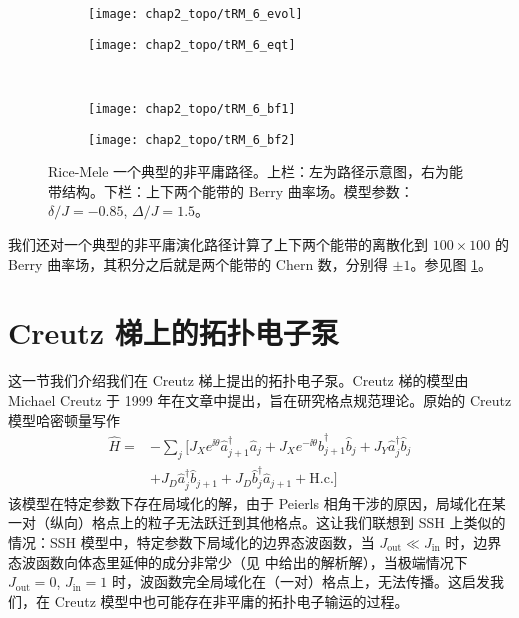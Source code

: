 \begin{figure}[!htb]
\centering
\begin{subfigure}{.45\textwidth}
\texttt{[image: chap2\_topo/tRM\_6\_evol]}
\end{subfigure}
\begin{subfigure}{.45\textwidth}
\texttt{[image: chap2\_topo/tRM\_6\_eqt]}
\end{subfigure}\\
\begin{subfigure}{.45\textwidth}
\texttt{[image: chap2\_topo/tRM\_6\_bf1]}
\end{subfigure}
\begin{subfigure}{.45\textwidth}
\texttt{[image: chap2\_topo/tRM\_6\_bf2]}
\end{subfigure}
\caption{Rice-Mele 一个典型的非平庸路径。上栏：左为路径示意图，右为能带结构。下栏：上下两个能带的 Berry 曲率场。模型参数：$\delta/J=-0.85$, $\Delta/J=1.5$。}
\label{fig:rmtberry}
\end{figure}

我们还对一个典型的非平庸演化路径计算了上下两个能带的离散化到 $100\times100$ 的 Berry 曲率场，其积分之后就是两个能带的 Chern 数，分别得 $\pm1$。参见图 \ref{fig:rmtberry}。



\section{ Creutz 梯上的拓扑电子泵}\label{sec:creutz}
这一节我们介绍我们在 Creutz 梯上提出的拓扑电子泵。Creutz 梯的模型由 Michael Creutz 于 1999 年在文章中提出，旨在研究格点规范理论。原始的 Creutz 模型哈密顿量写作
\begin{align}
\hat{H} =&-\sum_{j} [J_X e^{\ii\theta} \hat{a}_{j+1}^\dag \hat{a}_{j}+J_X e^{-\ii\theta} \hat{b}_{j+1}^\dag \hat{b}_{j} + J_Y \hat{a}_j^\dag \hat{b}_j 
\nonumber\\
&+ J_D \hat{a}_j^\dag \hat{b}_{j+1}+J_D \hat{b}_j^\dag \hat{a}_{j+1} +\textrm{H.c.}]
\end{align}
该模型在特定参数下存在局域化的解，由于 Peierls 相角干涉的原因，局域化在某一对（纵向）格点上的粒子无法跃迁到其他格点\cite{creutz1999}。这让我们联想到 SSH 上类似的情况：SSH 模型中，特定参数下局域化的边界态波函数，当 $J_{\text{out}}\ll J_{\text{in}}$ 时，边界态波函数向体态里延伸的成分非常少（见  中给出的解析解），当极端情况下 $J_{\text{out}}=0$, $J_{\text{in}}=1$ 时，波函数完全局域化在（一对）格点上，无法传播。这启发我们，在 Creutz 模型中也可能存在非平庸的拓扑电子输运的过程。

